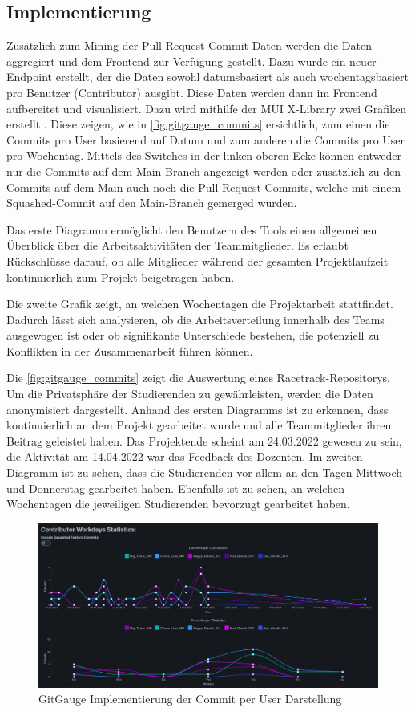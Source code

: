 \subsection{Implementierung}
Zusätzlich zum Mining der Pull-Request Commit-Daten werden die Daten aggregiert und dem Frontend zur Verfügung gestellt. Dazu wurde ein neuer Endpoint erstellt, der die Daten sowohl datumsbasiert als auch wochentagsbasiert pro Benutzer (Contributor) ausgibt. Diese Daten werden dann im Frontend aufbereitet und visualisiert. Dazu wird mithilfe der MUI X-Library zwei Grafiken erstellt \parencite{noauthor_react_nodate}. Diese zeigen, wie in \autoref{fig:gitgauge_commits} ersichtlich, zum einen die Commits pro User basierend auf Datum und zum anderen die Commits pro User pro Wochentag. Mittels des Switches in der linken oberen Ecke können entweder nur die Commits auf dem Main-Branch angezeigt werden oder zusätzlich zu den Commits auf dem Main auch noch die Pull-Request Commits, welche mit einem Squashed-Commit auf den Main-Branch gemerged wurden.

Das erste Diagramm ermöglicht den Benutzern des Tools einen allgemeinen Überblick über die Arbeitsaktivitäten der Teammitglieder. Es erlaubt Rückschlüsse darauf, ob alle Mitglieder während der gesamten Projektlaufzeit kontinuierlich zum Projekt beigetragen haben.

Die zweite Grafik zeigt, an welchen Wochentagen die Projektarbeit stattfindet. Dadurch lässt sich analysieren, ob die Arbeitsverteilung innerhalb des Teams ausgewogen ist oder ob signifikante Unterschiede bestehen, die potenziell zu Konflikten in der Zusammenarbeit führen können.

Die \autoref{fig:gitgauge_commits} zeigt die Auswertung eines Racetrack-Repositorys. Um die Privatsphäre der Studierenden zu gewährleisten, werden die Daten anonymisiert dargestellt. Anhand des ersten Diagramms ist zu erkennen, dass kontinuierlich an dem Projekt gearbeitet wurde und alle Teammitglieder ihren Beitrag geleistet haben. Das Projektende scheint am 24.03.2022 gewesen zu sein, die Aktivität am 14.04.2022 war das Feedback des Dozenten. Im zweiten Diagramm ist zu sehen, dass die Studierenden vor allem an den Tagen Mittwoch und Donnerstag gearbeitet haben. Ebenfalls ist zu sehen, an welchen Wochentagen die jeweiligen Studierenden bevorzugt gearbeitet haben.
\begin{figure}[htbp]
\includegraphics[width=\textwidth]{Figures/gitgauge_commits.png}
\caption{GitGauge Implementierung der Commit per User Darstellung }
\label{fig:gitgauge_commits}
\end{figure}



